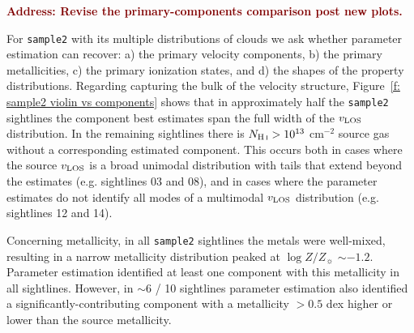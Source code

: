 \documentclass[fleqn,usenatbib]{mnras}
\newcommand{\todo}[1]{\textcolor{Maroon}{\textbf{Address: #1}}}
\newcommand{\metallicity}{$\log Z/Z_{\sun}$}
\begin{document}
\todo{Revise the primary-components comparison post new plots.}

For \texttt{sample2} with its multiple distributions of clouds we ask whether parameter estimation can recover:
a) the primary velocity components,
b) the primary metallicities,
c) the primary ionization states, and
d) the shapes of the property distributions.
Regarding capturing the bulk of the velocity structure, Figure~\ref{f: sample2 violin vs components} shows that in approximately half the \texttt{sample2} sightlines the component best estimates span the full width of the $v_{\rm LOS}$ distribution.
In the remaining sightlines there is $N_{\ion{H}{I}}>10^{13}$ cm$^{-2}$ source gas without a corresponding estimated component.
This occurs both in cases where the source $v_{\rm LOS}$ is a broad unimodal distribution with tails that extend beyond the estimates (e.g. sightlines 03 and 08),
and in cases where the parameter estimates do not identify all modes of a multimodal $v_{\rm LOS}$ distribution (e.g. sightlines 12 and 14).

Concerning metallicity, in all \texttt{sample2} sightlines the metals were well-mixed, resulting in a narrow metallicity distribution peaked at {\metallicity} $\sim -1.2$.
Parameter estimation identified at least one component with this metallicity in all sightlines.
However, in $\sim 6$ / 10 sightlines parameter estimation also identified a significantly-contributing component with a metallicity $>0.5$ dex higher or lower than the source metallicity.
\end{document}
